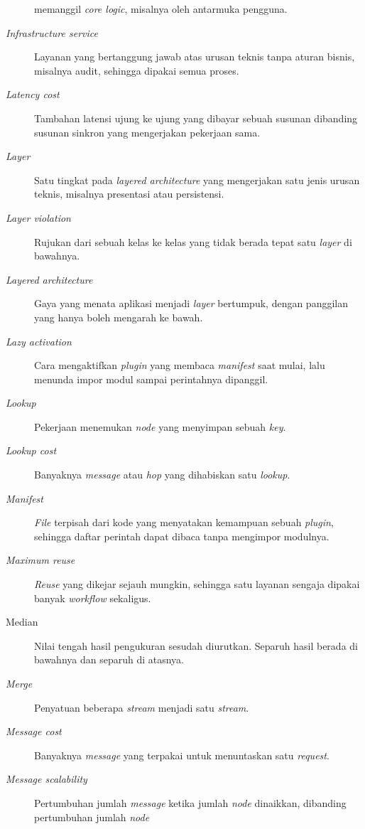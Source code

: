 \begin{description}
    memanggil \textit{core logic}, misalnya oleh antarmuka pengguna.
  \item[\textit{Infrastructure service}] Layanan yang bertanggung jawab atas
    urusan teknis tanpa aturan bisnis, misalnya audit, sehingga dipakai semua
    proses.
  \item[\textit{Latency cost}] Tambahan latensi ujung ke ujung yang dibayar
    sebuah susunan dibanding susunan sinkron yang mengerjakan pekerjaan sama.
  \item[\textit{Layer}] Satu tingkat pada \textit{layered architecture} yang
    mengerjakan satu jenis urusan teknis, misalnya presentasi atau persistensi.
  \item[\textit{Layer violation}] Rujukan dari sebuah kelas ke kelas yang tidak
    berada tepat satu \textit{layer} di bawahnya.
  \item[\textit{Layered architecture}] Gaya yang menata aplikasi menjadi
    \textit{layer} bertumpuk, dengan panggilan yang hanya boleh mengarah ke
    bawah.
  \item[\textit{Lazy activation}] Cara mengaktifkan \textit{plugin} yang membaca
    \textit{manifest} saat mulai, lalu menunda impor modul sampai perintahnya
    dipanggil.
  \item[\textit{Lookup}] Pekerjaan menemukan \textit{node} yang menyimpan sebuah
    \textit{key}.
  \item[\textit{Lookup cost}] Banyaknya \textit{message} atau \textit{hop} yang
    dihabiskan satu \textit{lookup}.
  \item[\textit{Manifest}] \textit{File} terpisah dari kode yang menyatakan
    kemampuan sebuah \textit{plugin}, sehingga daftar perintah dapat dibaca
    tanpa mengimpor modulnya.
  \item[\textit{Maximum reuse}] \textit{Reuse} yang dikejar sejauh mungkin,
    sehingga satu layanan sengaja dipakai banyak \textit{workflow} sekaligus.
  \item[Median] Nilai tengah hasil pengukuran sesudah diurutkan. Separuh hasil
    berada di bawahnya dan separuh di atasnya.
  \item[\textit{Merge}] Penyatuan beberapa \textit{stream} menjadi satu
    \textit{stream}.
  \item[\textit{Message cost}] Banyaknya \textit{message} yang terpakai
    untuk menuntaskan satu \textit{request}.
  \item[\textit{Message scalability}] Pertumbuhan jumlah \textit{message} ketika
    jumlah \textit{node} dinaikkan, dibanding pertumbuhan jumlah \textit{node}

\end{description}
